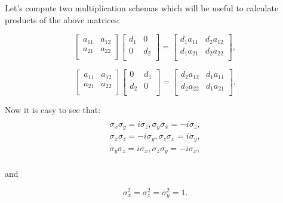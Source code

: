 \documentclass[main.tex]{subfiles}
\begin{document}
Let's compute two multiplication schemas which will be useful to calculate products of the above matrices:

\begin{equation}
\begin{bmatrix}
    a_{11} &  a_{12} \\
    a_{21} & a_{22} \\
\end{bmatrix}
\begin{bmatrix}
    d_1 & 0 \\
    0 & d_2 \\
\end{bmatrix}
= \begin{bmatrix}
    d_1 a_{11} &  d_2 a_{12} \\
    d_1 a_{21} & d_2 a_{22} \\
\end{bmatrix},
\end{equation}

\begin{equation}
\begin{bmatrix}
    a_{11} &  a_{12} \\
    a_{21} & a_{22} \\
\end{bmatrix}
\begin{bmatrix}
    0 & d_1 \\
    d_2 & 0 \\
\end{bmatrix}
= \begin{bmatrix}
    d_2 a_{12} &  d_1 a_{11} \\
    d_2 a_{22} & d_1 a_{21} \\
\end{bmatrix}.
\end{equation}


Now it is easy to see that:
\begin{multline}\\
\sigma_x \sigma_y = i\sigma_z, \sigma_y\sigma_x = -i\sigma_z,\\
\sigma_x \sigma_z = -i\sigma_y, \sigma_z\sigma_x = i\sigma_y,\\
\sigma_y \sigma_z = i\sigma_x, \sigma_z\sigma_y = -i\sigma_x,\\
\end{multline}

and

\begin{equation}
\sigma_x^2 = \sigma_z^2 = \sigma_y^2 = 1.
\end{equation}
\end{document}
